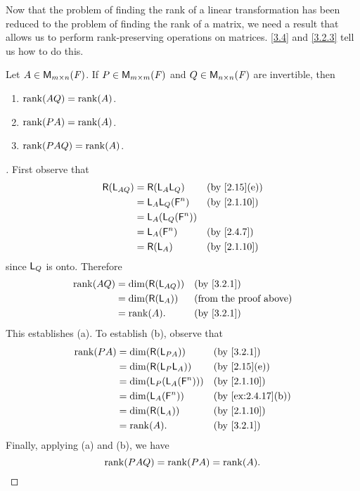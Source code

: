 \begin{note}
	Now that the problem of finding the rank of a linear transformation has been reduced to the problem of finding the rank of a matrix, we need a result that allows us to perform rank-preserving operations on matrices.
	\cref{3.4} and \cref{3.2.3} tell us how to do this.
\end{note}

\begin{thm}\label{3.4}
	Let \(A \in \MS\).
	If \(P \in \ms[m][m][\F]\) and \(Q \in \ms[n][n][\F]\) are invertible, then
	\begin{enumerate}
		\item \(\rk{AQ} = \rk{A}\).
		\item \(\rk{PA} = \rk{A}\).
		\item \(\rk{PAQ} = \rk{A}\).
	\end{enumerate}
\end{thm}

\begin{proof}[]
	First observe that
	\begin{align*}
		\rg{\L_{AQ}} & = \rg{\L_A \L_Q}       &  & \by{2.15}[e] \\
		             & = \L_A \L_Q(\vs{F}^n)  &  & \by{2.1.10}  \\
		             & = \L_A(\L_Q(\vs{F}^n))                   \\
		             & = \L_A(\vs{F}^n)       &  & \by{2.4.7}   \\
		             & = \rg{\L_A}            &  & \by{2.1.10}
	\end{align*}
	since \(\mathsf{L}_Q\) is onto.
	Therefore
	\begin{align*}
		\rk{AQ} & = \dim(\rg{\L_{AQ}}) &  & \by{3.2.1}                    \\
		        & = \dim(\rg{\L_A})    &  & \text{(from the proof above)} \\
		        & = \rk{A}.            &  & \by{3.2.1}
	\end{align*}
	This establishes (a).
	To establish (b), observe that
	\begin{align*}
		\rk{PA} & = \dim(\rg{\L_{PA}})         &  & \by{3.2.1}        \\
		        & = \dim(\rg{\L_P \L_A})       &  & \by{2.15}[e]      \\
		        & = \dim(\L_P(\L_A(\vs{F}^n))) &  & \by{2.1.10}       \\
		        & = \dim(\L_A(\vs{F}^n))       &  & \by{ex:2.4.17}[b] \\
		        & = \dim(\rg{\L_A})            &  & \by{2.1.10}       \\
		        & = \rk{A}.                    &  & \by{3.2.1}
	\end{align*}
	Finally, applying (a) and (b), we have
	\[
		\rk{PAQ} = \rk{PA} = \rk{A}.
	\]
\end{proof}

